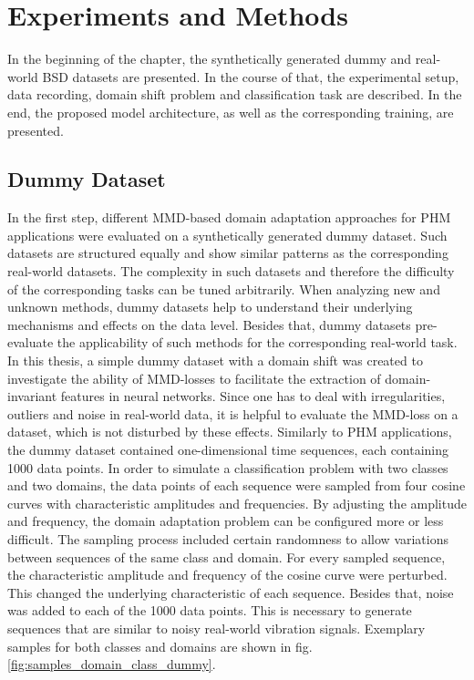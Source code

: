 \chapter{Experiments and Methods}\label{chapter:experiments}
In the beginning of the chapter, the synthetically generated dummy and real-world BSD datasets are presented. In the course of that, the experimental setup, data recording, domain shift problem and classification task are described. In the end, the proposed model architecture, as well as the corresponding training, are presented. 
\section{Dummy Dataset}
In the first step, different MMD-based domain adaptation approaches for PHM applications were evaluated on a synthetically generated dummy dataset. Such datasets are structured equally and show similar patterns as the corresponding real-world datasets. The complexity in such datasets and therefore the difficulty of the corresponding tasks can be tuned arbitrarily. When analyzing new and unknown methods, dummy datasets help to understand their underlying mechanisms and effects on the data level. Besides that, dummy datasets pre-evaluate the applicability of such methods for the corresponding real-world task. In this thesis, a simple dummy dataset with a domain shift was created to investigate the ability of MMD-losses to facilitate the extraction of domain-invariant features in neural networks. Since one has to deal with irregularities, outliers and noise in real-world data, it is helpful to evaluate the MMD-loss on a dataset, which is not disturbed by these effects. Similarly to PHM applications, the dummy dataset contained one-dimensional time sequences, each containing 1000 data points. In order to simulate a classification problem with two classes and two domains, the data points of each sequence were sampled from four cosine curves with characteristic amplitudes and frequencies. By adjusting the amplitude and frequency, the domain adaptation problem can be configured more or less difficult. The sampling process included certain randomness to allow variations between sequences of the same class and domain. For every sampled sequence, the characteristic amplitude and frequency of the cosine curve were perturbed. This changed the underlying characteristic of each sequence. Besides that, noise was added to each of the 1000 data points. This is necessary to generate sequences that are similar to noisy real-world vibration signals. Exemplary samples for both classes and domains are shown in fig. \ref{fig:samples_domain_class_dummy}.

